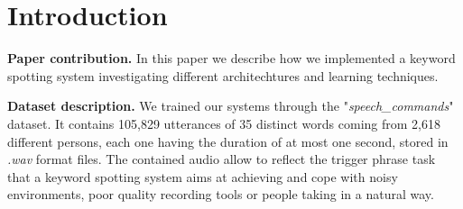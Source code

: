 
\section{Introduction}
\label{sec:introduction}

\begin{remark}
\textbf{Paper contribution.} In this paper we describe how we implemented a keyword spotting system investigating different architechtures and learning techniques. 
\end{remark}

\begin{remark}
\textbf{Dataset description.} We trained our systems through the "{\it speech\_commands}" dataset. It contains 105,829 utterances of 35 distinct words coming from 2,618 different persons, each one having the duration of at most one second, stored in {\it .wav} format files. The contained audio allow to reflect the trigger phrase task that a keyword spotting system aims at achieving and cope with noisy environments, poor quality recording tools or people taking in a natural way. 
\end{remark}

\\


